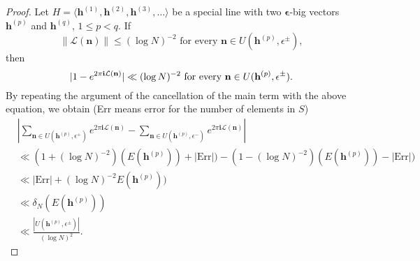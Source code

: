 \documentclass[11pt]{article}
\newcommand{\beq}{\begin{equation}}
\newcommand{\eeq}{\end{equation}}
\newcommand{\fc}{\frac}
\renewcommand{\l}{\left}
\renewcommand{\r}{\right}
\newcommand{\e}{\epsilon}
\renewcommand{\i}{\mathbf{i}}
\renewcommand{\(}{\left(}
\renewcommand{\)}{\right)}
\renewcommand{\bf}{\mathbf}
\renewcommand{\d}{\delta}
\newcommand{\bal}{\begin{aligned}}
\newcommand{\eal}{\end{aligned}}
\renewcommand{\L}{\mathcal{L}}
\newcommand{\<}{\langle}
\renewcommand{\>}{\rangle}
\begin{document}
\begin{proof}
Let $H=\<\bf{h}^{(1)},\bf{h}^{(2)},\bf{h}^{(3)},\dots\>$ be a special line with two $\bm{\e}$-big vectors $\bf{h}^{(p)}$ and $\bf{h}^{(q)}$, $1\le p<q$. If 
\beq\label{small L(n)}
\|\L(\bf{n})\|\le (\log N)^{-2} \text{ for every $\bf{n}\in U(\bf{h}^{(p)},\e^{\pm})$},
\eeq
then 
\beq{\label{1-exp small}}
|1-e^{2\pi \i \L(\bf{n})}|\ll (\log N)^{-2} \text{ for every $\bf{n}\in U(\bf{h}^{(p)},\e^{\pm})$}.
\eeq
By repeating the argument of the cancellation of the main term with the above equation, we obtain (Err means error for the number of elements in $S$)
$$
\bal
&\l|\sum_{\bf{n}\in U(\bf{h}^{(p)},\e^+)}e^{2\pi \i \L(\bf{n})}-\sum_{\bf{n}\in U(\bf{h}^{(p)},\e^-)}e^{2\pi \i \L(\bf{n})}\r|\\
&\ll (1+(\log N)^{-2})(E(\bf{h}^{(p)}))+|\text{Err}|)-(1-(\log N)^{-2})(E(\bf{h}^{(p)}))-|\text{Err}|)\\
&\ll |\text{Err}|+(\log N)^{-2}E(\bf{h}^{(p)}))\\
&\ll \d_N(E(\bf{h}^{(p)}))\\
&\ll \fc{|U(\bf{h}^{(p)},\e^{\pm})|}{(\log N)^2}.
\eal
$$


\end{proof}
\end{document}
